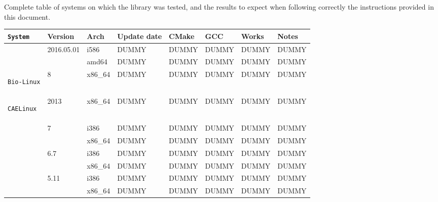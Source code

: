 \documentclass[11pt,twoside,openany,x11names,svgnames]{memoir}
\begin{document}
Complete table of systems on which the library was tested, and the results to expect when following correctly the instructions provided in this document.
{\footnotesize
\begin{longtable}{| >{\bfseries}p{3cm} | p{2cm} | p{1cm} | p{2cm} | p{1.5cm} | p{1.5cm} | p{1.5cm} | p{1.5cm} |}
	\hline
	
	\texttt{System}                               & Version                        & Arch   & Update date & CMake & GCC   & Works & Notes \\
	
	\hline
	\hline
	
	\multirow{2}{*}{\texttt{Arch Linux}}          & \multirow{2}{*}{2016.05.01}    & i586   & DUMMY       & DUMMY & DUMMY & DUMMY & DUMMY \\
											    							       \cline{3-8}
	                                              &                                & amd64  & DUMMY       & DUMMY & DUMMY & DUMMY & DUMMY \\
	                                             
	\hline
	
	\texttt{Bio-Linux}                            & 8                              & x86\_64& DUMMY       & DUMMY & DUMMY & DUMMY & DUMMY \\	
	
	\hline
	
	\texttt{CAELinux}                             & 2013                           & x86\_64& DUMMY       & DUMMY & DUMMY & DUMMY & DUMMY \\	
	
	\hline
	
	\multirow{6}{*}{\texttt{CentOS}}              & \multirow{2}{*}{7}             & i386   & DUMMY       & DUMMY & DUMMY & DUMMY & DUMMY \\
																		           \cline{3-8}
	                                              &                                & x86\_64& DUMMY       & DUMMY & DUMMY & DUMMY & DUMMY \\
	                                              \cline{2-8}
	                                              & \multirow{2}{*}{6.7}           & i386   & DUMMY       & DUMMY & DUMMY & DUMMY & DUMMY \\
	                                         							           \cline{3-8}
	                                              &                                & x86\_64& DUMMY       & DUMMY & DUMMY & DUMMY & DUMMY \\
	                                              \cline{2-8}
	                                              & \multirow{2}{*}{5.11}          & i386   & DUMMY       & DUMMY & DUMMY & DUMMY & DUMMY \\
	                                         							           \cline{3-8}
	                                              &                                & x86\_64& DUMMY       & DUMMY & DUMMY & DUMMY & DUMMY \\
	                                             

\end{longtable}}
\end{document}
